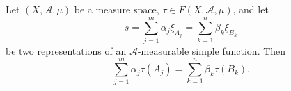 Let $(X, \mathcal{A}, \mu)$ be a measure space, $\tau \in F(X, \mathcal{A}, \mu)$, and let
$$s = \sum_{j=1}^{m} \alpha_j \xi_{A_j} = \sum_{k=1}^{n} \beta_k \xi_{B_k}$$
be two representations of an $\mathcal{A}$-measurable simple function. Then
$$\sum_{j=1}^{m} \alpha_j \tau(A_j) = \sum_{k=1}^{n} \beta_k \tau(B_k).$$
